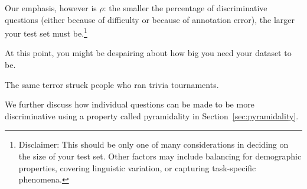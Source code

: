 Our emphasis, however is $\rho$: the smaller the percentage of discriminative questions (either because of difficulty or because of annotation error), the larger your test set must be.\footnote{Disclaimer: This should be only one of many considerations in deciding on the size of your test set.  Other factors may include balancing for demographic properties, covering linguistic variation, or capturing task-specific phenomena.}

At this point, you might be despairing about how big you need your dataset to be.

The same terror struck people who ran trivia tournaments.

We further discuss how individual questions can be made to be more discriminative using a property called pyramidality in Section~\ref{sec:pyramidality}.

